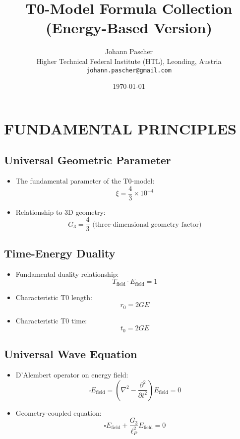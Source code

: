 \documentclass[12pt,a4paper]{article}
\title{T0-Model Formula Collection\\
	\large (Energy-Based Version)}
\author{Johann Pascher\\
	\small Higher Technical Federal Institute (HTL), Leonding, Austria\\
	\small \texttt{johann.pascher@gmail.com}}
\date{\today}
\begin{document}
	
	\maketitle
	\tableofcontents
	\newpage
	
	\section{FUNDAMENTAL PRINCIPLES}
	
	\subsection{Universal Geometric Parameter}
	\begin{itemize}
		\item The fundamental parameter of the T0-model:
		$$\xi = \frac{4}{3} \times 10^{-4}$$
		
		\item Relationship to 3D geometry:
		$$G_3 = \frac{4}{3} \text{ (three-dimensional geometry factor)}$$
	\end{itemize}
	
	\subsection{Time-Energy Duality}
	\begin{itemize}
		\item Fundamental duality relationship:
		$$T_{\text{field}} \cdot E_{\text{field}} = 1$$
		
		\item Characteristic T0 length:
		$$r_0 = 2GE$$
		
		\item Characteristic T0 time:
		$$t_0 = 2GE$$
	\end{itemize}
	
	\subsection{Universal Wave Equation}
	\begin{itemize}
		\item D'Alembert operator on energy field:
		$$\square E_{\text{field}} = \left(\nabla^2 - \frac{\partial^2}{\partial t^2}\right) E_{\text{field}} = 0$$
		
		\item Geometry-coupled equation:
		$$\square E_{\text{field}} + \frac{G_3}{\ell_P^2} E_{\text{field}} = 0$$
	\end{itemize}
	
\end{document}
